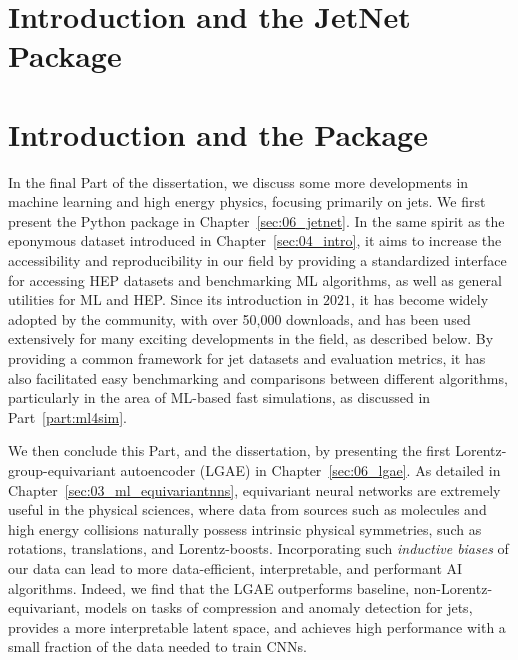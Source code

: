 

\ifdefined\HCode
    \chapter{Introduction and the JetNet Package}
\else
    \chapter{Introduction and the \jetnet Package}
\fi

\label{sec:06_jetnet}

In the final Part of the dissertation, we discuss some more developments in machine learning and high energy physics, focusing primarily on jets.
We first present the \jetnet Python package in Chapter~\ref{sec:06_jetnet}.
In the same spirit as the eponymous dataset introduced in Chapter~\ref{sec:04_intro}, it aims to increase the accessibility and reproducibility in our field by providing a standardized interface for accessing HEP datasets and benchmarking ML algorithms, as well as general utilities for ML and HEP.
Since its introduction in $2021$, it has become widely adopted by the community, with over 50,000 downloads, and has been used extensively for many exciting developments in the field, as described below.
By providing a common framework for jet datasets and evaluation metrics, it has also facilitated easy benchmarking and comparisons between different algorithms, particularly in the area of ML-based fast simulations, as discussed in Part~\ref{part:ml4sim}.

We then conclude this Part, and the dissertation, by presenting the first Lorentz-group-equivariant autoencoder (LGAE) in Chapter~\ref{sec:06_lgae}.
As detailed in Chapter~\ref{sec:03_ml_equivariantnns}, equivariant neural networks are extremely useful in the physical sciences, where data from sources such as molecules and high energy collisions naturally possess intrinsic physical symmetries, such as rotations, translations, and Lorentz-boosts.
Incorporating such \textit{inductive biases} of our data can lead to more data-efficient, interpretable, and performant AI algorithms.
Indeed, we find that the LGAE outperforms baseline, non-Lorentz-equivariant, models on tasks of compression and anomaly detection for jets, provides a more interpretable latent space, and achieves high performance with a small fraction of the data needed to train CNNs.

